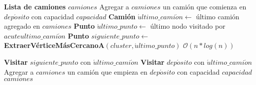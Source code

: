 \begin{algorithm}[H]
\caption{\Comment $\mathcal{O}(n^2*log(n))$}
\label{sweep-build-routes}
\begin{algorithmic}[1]
	\State \textbf{Lista de camiones} $camiones$
	\State Agregar a $camiones$ un camión que comienza en $dep\acute{o}sito$ con capacidad $capacidad$
	\Statex
			\State \textbf{Camión} $\acute{u}ltimo\_cami\acute{o}n \gets$ último camión agregado en $camiones$
			\State \textbf{Punto} $\acute{u}ltimo\_punto \gets$ último nodo visitado por $acute{u}ltimo\_cami\acute{o}n$
			\Statex
			\State \textbf{Punto} $siguiente\_punto \gets$ 
			\Statex[5] \textbf{ExtraerVérticeMásCercanoA}$(cluster, \acute{u}ltimo\_punto)$
			\Comment $\mathcal{O}(n*log(n))$

			\State \textbf{Visitar} $siguiente\_punto$ con $\acute{u}ltimo\_cami\acute{o}n$
		\EndWhile
		\Statex
		\State \textbf{Visitar} $dep\acute{o}sito$ con $\acute{u}ltimo\_cami\acute{o}n$
		\State Agregar a $camiones$ un camión que empieza en $dep\acute{o}sito$ con capacidad $capacidad$
	\EndFor
	\Statex
	\State \Return $camiones$
\EndFunction
\end{algorithmic}
\end{algorithm}